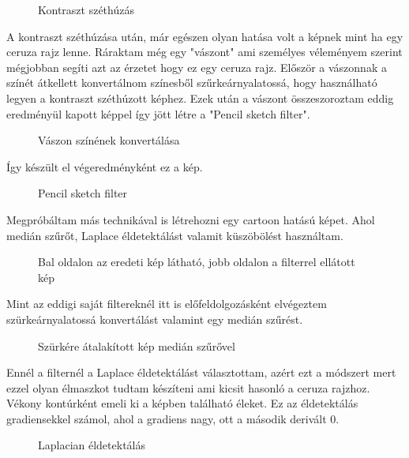 \begin{figure}[ht]
\centering
{}
\caption{Kontraszt széthúzás } 
\label{fig: pencil5}
\end{figure}
A kontraszt széthúzása után, már egészen olyan hatása volt a képnek mint ha egy ceruza rajz lenne. Ráraktam még egy "vászont" ami személyes véleményem szerint mégjobban segíti azt az érzetet hogy ez egy ceruza rajz. Először a vászonnak a színét átkellett konvertálnom színesből szűrkeárnyalatossá, hogy használható legyen a kontraszt széthúzott képhez. Ezek után a vászont összeszoroztam eddig eredményül kapott képpel így jött létre a "Pencil sketch filter".
\begin{figure}[ht] 
\centering
{}
\caption{Vászon színének konvertálása } 
\label{fig: pencil6}
\end{figure}
Így készült el végeredményként ez a kép.
\begin{figure}[ht]
\centering
{}
\caption{Pencil sketch filter } 
\label{fig: pencil7}
\end{figure}
\newpage
{}
Megpróbáltam más technikával is létrehozni egy cartoon hatású képet. Ahol medián szűrőt, Laplace éldetektálást valamit küszöbölést használtam.
\begin{figure}[ht]
\centering
{}
\caption{Bal oldalon az eredeti kép látható, jobb oldalon a filterrel ellátott kép } 
\label{fig: 2_cartoon1}
\end{figure}
Mint az eddigi saját filtereknél itt is előfeldolgozásként elvégeztem szürkeárnyalatossá konvertálást valamint egy  medián szűrést. 
\begin{figure}[ht]
\centering
{}
\caption{Szürkére átalakított kép medián szűrővel  } 
\label{fig:  2_cartoon2}
\end{figure}
Ennél a filternél a Laplace éldetektálást választottam, azért ezt a módszert mert ezzel olyan élmaszkot tudtam készíteni ami kicsit hasonló a ceruza rajzhoz. Vékony kontúrként emeli ki a képben található éleket. Ez az éldetektálás gradiensekkel számol, ahol a gradiens nagy, ott a második derivált 0.
\begin{figure}[ht]
\centering
{}
\caption{Laplacian éldetektálás  } 
\label{fig:  2_cartoon3}
\end{figure}
